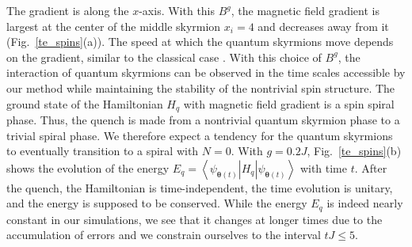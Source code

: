 \documentclass[aps,prb,twocolumn,superscriptaddress,a4paper,longbibliography]{revtex4-2}
\begin{document}
The gradient is along the $x$-axis. With this $B^g$, the magnetic field gradient is largest at the center of the middle skyrmion $x_i=4$ and decreases away from it (Fig.~\ref{te_spins}(a)). The speed at which the quantum skyrmions move depends on the gradient, similar to the classical case \cite{komineas_skyrmion_2015}. With this choice of $B^g$, the interaction of quantum skyrmions can be observed in the time scales accessible by our method while maintaining the stability of the nontrivial spin structure. The ground state of the Hamiltonian $H_q$ with magnetic field gradient is a spin spiral phase. Thus, the quench is made from a nontrivial quantum skyrmion phase to a trivial spiral phase. We therefore expect a tendency for the quantum skyrmions to eventually transition to a spiral with $N=0$. With $g=0.2J$, Fig.~\ref{te_spins}(b) shows the evolution of the energy $E_q=\left<\psi_{\boldsymbol{\theta}(t)}\right|H_q\left|\psi_{\boldsymbol{\theta}(t)}\right>$ with time $t$. After the quench, the Hamiltonian is time-independent, the time evolution is unitary, and the energy is supposed to be conserved. While the energy $E_q$ is indeed nearly constant in our simulations, we see that it changes at longer times due to the accumulation of errors \cite{donatella_dynamics_2023,hofmann_role_2022} and we constrain ourselves to the interval $tJ\leq 5$.
\end{document}
